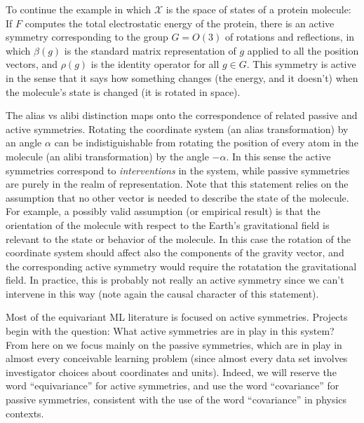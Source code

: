 \documentclass[preprint]{article} %
\renewcommand{\mathcal}[1]{\mathscr{#1}} %
\begin{document}
To continue the example in which $\mathcal{X}$ is the space of states of a protein molecule:
If $F$ computes the total electrostatic energy of the protein, there is an active symmetry corresponding to the group $G=O(3)$ of rotations and reflections, in which $\beta(g)$ is the standard matrix representation of $g$ applied to all the position vectors, and $\rho(g)$ is the identity operator for all $g\in G$.
This symmetry is active in the sense that it says how something changes (the energy, and it doesn't) when the molecule's state is changed (it is rotated in space).

The alias vs alibi distinction maps onto the correspondence of related passive and active symmetries.
Rotating the coordinate system (an alias transformation) by an angle $\alpha$ can be indistiguishable from rotating the position of every atom in the molecule (an alibi transformation) by the angle $-\alpha$. 
In this sense the active symmetries correspond to \emph{interventions} in the system, while passive symmetries are purely in the realm of representation.
Note that this statement relies on the assumption that no other vector is needed to describe the state of the molecule. 
For example, a possibly valid assumption (or empirical result) is that the orientation of the molecule with respect to the Earth's gravitational field is relevant to the state or behavior of the molecule. 
In this case the rotation of the coordinate system should affect also the components of the gravity vector, and the corresponding active symmetry would require the rotatation the gravitational field.
In practice, this is probably not really an active symmetry since we can't intervene in this way (note again the causal character of this statement).

Most of the equivariant ML literature is focused on active symmetries.
Projects begin with the question: What active symmetries are in play in this system?
From here on we focus mainly on the passive symmetries, which are in play in almost every conceivable learning problem (since almost every data set involves investigator choices about coordinates and units).
Indeed, we will reserve the word ``equivariance'' for active symmetries, and use the word ``covariance'' for passive symmetries, consistent with the use of the word ``covariance'' in physics contexts.
\end{document}
